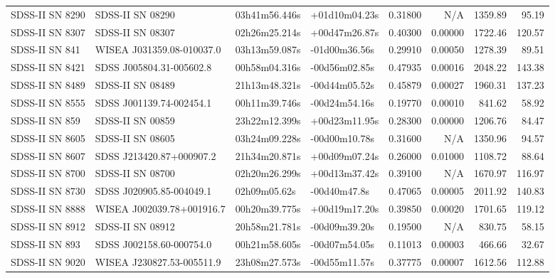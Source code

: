 \begin{longtable}{llllrrrr}
SDSS-II SN 8290  &                SDSS-II SN 08290 &   03h41m56.446s &   +01d10m04.23s &  0.31800 &      N/A &  1359.89 &       95.19 \\
SDSS-II SN 8307  &                SDSS-II SN 08307 &   02h26m25.214s &   +00d47m26.87s &  0.40300 &  0.00000 &  1722.46 &      120.57 \\
SDSS-II SN 841   &       WISEA J031359.08-010037.0 &   03h13m59.087s &   -01d00m36.56s &  0.29910 &  0.00050 &  1278.39 &       89.51 \\
SDSS-II SN 8421  &        SDSS J005804.31-005602.8 &   00h58m04.316s &   -00d56m02.85s &  0.47935 &  0.00016 &  2048.22 &      143.38 \\
SDSS-II SN 8489  &                SDSS-II SN 08489 &   21h13m48.321s &   -00d44m05.52s &  0.45879 &  0.00027 &  1960.31 &      137.23 \\
SDSS-II SN 8555  &        SDSS J001139.74-002454.1 &   00h11m39.746s &   -00d24m54.16s &  0.19770 &  0.00010 &   841.62 &       58.92 \\
SDSS-II SN 859   &                SDSS-II SN 00859 &   23h22m12.399s &   +00d23m11.95s &  0.28300 &  0.00000 &  1206.76 &       84.47 \\
SDSS-II SN 8605  &                SDSS-II SN 08605 &   03h24m09.228s &   -00d00m10.78s &  0.31600 &      N/A &  1350.96 &       94.57 \\
SDSS-II SN 8607  &        SDSS J213420.87+000907.2 &   21h34m20.871s &   +00d09m07.24s &  0.26000 &  0.01000 &  1108.72 &       88.64 \\
SDSS-II SN 8700  &                SDSS-II SN 08700 &   02h20m26.299s &   +00d13m37.42s &  0.39100 &      N/A &  1670.97 &      116.97 \\
SDSS-II SN 8730  &        SDSS J020905.85-004049.1 &    02h09m05.62s &    -00d40m47.8s &  0.47065 &  0.00005 &  2011.92 &      140.83 \\
SDSS-II SN 8888  &       WISEA J002039.78+001916.7 &   00h20m39.775s &   +00d19m17.20s &  0.39850 &  0.00020 &  1701.65 &      119.12 \\
SDSS-II SN 8912  &                SDSS-II SN 08912 &   20h58m21.781s &   -00d09m39.20s &  0.19500 &      N/A &   830.75 &       58.15 \\
SDSS-II SN 893   &        SDSS J002158.60-000754.0 &   00h21m58.605s &   -00d07m54.05s &  0.11013 &  0.00003 &   466.66 &       32.67 \\
SDSS-II SN 9020  &       WISEA J230827.53-005511.9 &   23h08m27.573s &   -00d55m11.57s &  0.37775 &  0.00007 &  1612.56 &      112.88 \\

\end{longtable}
